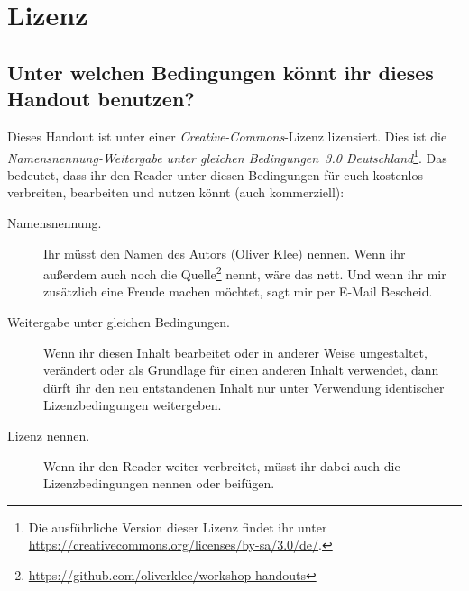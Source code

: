 \chapter{Lizenz}

\section*{Unter welchen Bedingungen könnt ihr dieses Handout benutzen?}
Dieses Handout ist unter einer \emph{Creative-Commons}-Lizenz lizensiert. Dies ist die \emph{Namensnennung-Weitergabe unter gleichen Bedingungen~3.0 Deutschland}\footnote{Die ausführliche Version dieser Lizenz findet ihr unter \url{https://creativecommons.org/licenses/by-sa/3.0/de/}.}. Das bedeutet, dass ihr den Reader unter diesen Bedingungen für euch kostenlos verbreiten, bearbeiten und nutzen könnt (auch kommerziell):
\begin{description}
  \item[Namensnennung.] Ihr müsst den Namen des Autors (Oliver Klee) nennen. Wenn ihr außerdem auch noch die Quelle\footnote{\url{https://github.com/oliverklee/workshop-handouts}} nennt, wäre das nett. Und wenn ihr mir zusätzlich eine Freude machen möchtet, sagt mir per E-Mail Bescheid.
  \item[Weitergabe unter gleichen Bedingungen.] Wenn ihr diesen Inhalt bearbeitet oder in anderer Weise umgestaltet, verändert oder als Grundlage für einen anderen Inhalt verwendet, dann dürft ihr den neu entstandenen Inhalt nur unter Verwendung identischer Lizenzbedingungen weitergeben.
  \item[Lizenz nennen.] Wenn ihr den Reader weiter verbreitet, müsst ihr dabei auch die Lizenzbedingungen nennen oder beifügen.
\end{description}
